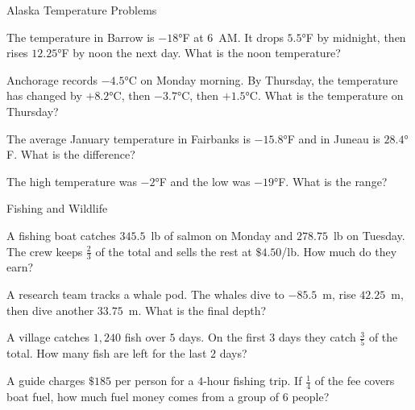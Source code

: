 \begin{practiceBox}{Alaska Temperature Problems}


\prob The temperature in Barrow is $-18°$F at 6~AM. It drops $5.5°$F by midnight, then rises $12.25°$F by noon the next day. What is the noon temperature?

\prob Anchorage records $-4.5°$C on Monday morning. By Thursday, the temperature has changed by $+8.2°$C, then $-3.7°$C, then $+1.5°$C. What is the temperature on Thursday?

\prob The average January temperature in Fairbanks is $-15.8°$F and in Juneau is $28.4°$F. What is the difference?

\prob The high temperature was $-2°$F and the low was $-19°$F. What is the range?

\end{practiceBox}

\begin{practiceBox}[funTeal]{Fishing and Wildlife}


\prob A fishing boat catches $345.5$~lb of salmon on Monday and $278.75$~lb on Tuesday. The crew keeps $\frac{2}{3}$ of the total and sells the rest at $\$4.50$/lb. How much do they earn?

\prob A research team tracks a whale pod. The whales dive to $-85.5$~m, rise $42.25$~m, then dive another $33.75$~m. What is the final depth?

\prob A village catches $1{,}240$ fish over $5$ days. On the first $3$ days they catch $\frac{3}{5}$ of the total. How many fish are left for the last $2$ days?

\prob A guide charges $\$185$ per person for a $4$-hour fishing trip. If $\frac{1}{4}$ of the fee covers boat fuel, how much fuel money comes from a group of $6$ people?

\end{practiceBox}

